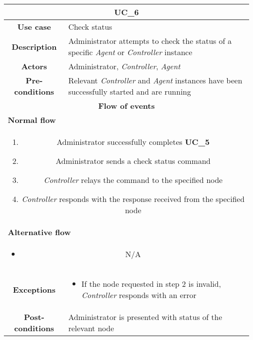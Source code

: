             \vspace{0.5cm}
            \noindent
            \begin{longtable}{ |c|p{11.8cm}| }
                \hline
                \multicolumn{2}{|c|}{\cellcolor{lime} \textbf{UC\_6}}\\ \hline
                \cellcolor[gray]{0.9} \textbf{Use case} & Check status\\ \hline
                \cellcolor[gray]{0.9} \textbf{Description} & Administrator attempts to check the status of a specific \textit{Agent} or \textit{Controller} instance\\ \hline
                \cellcolor[gray]{0.9} \textbf{Actors} & Administrator, \textit{Controller}, \textit{Agent}\\ \hline
                \cellcolor[gray]{0.9} \textbf{Pre-conditions} & Relevant \textit{Controller} and \textit{Agent} instances have been successfully started and are running\\ \hline
                \multicolumn{2}{|c|}{\cellcolor[gray]{0.9} \textbf{Flow of events}}\\ \hline
                \multicolumn{2}{|l|}{\cellcolor[gray]{0.9} \textbf{Normal flow}}\\ \hline
                \multicolumn{2}{|p{14cm}|}{
                    \begin{enumerate}
                        \item Administrator successfully completes \textbf{UC\_5}
                        \item Administrator sends a check status command
                        \item \textit{Controller} relays the command to the specified node
                        \item \textit{Controller} responds with the response received from the specified node
                    \end{enumerate}
                }\\ \hline
                \multicolumn{2}{|l|}{\cellcolor[gray]{0.9} \textbf{Alternative flow}}\\ \hline
                \multicolumn{2}{|p{14cm}|}{
                    \begin{itemize}
                        \item N/A
                    \end{itemize}
                }\\ \hline
                \cellcolor[gray]{0.9} \textbf{Exceptions} & 
                    \begin{itemize}
                        \item If the node requested in step 2 is invalid, \textit{Controller} responds with an error
                    \end{itemize}\\ \hline
                \cellcolor[gray]{0.9} \textbf{Post-conditions} & Administrator is presented with status of the relevant node\\ \hline
            \end{longtable}

